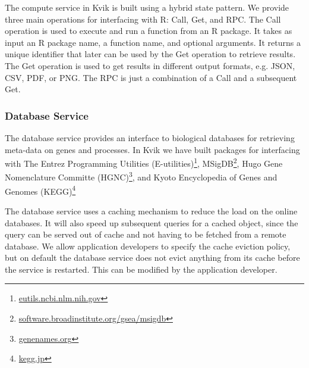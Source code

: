 The compute service in Kvik is built using a hybrid state
pattern\cite{opencpu}.
We provide three main operations for interfacing with R:
Call, Get, and RPC. The Call operation is used to execute and run a function
from an R package. It takes as input an R package name, a function name, and
optional arguments. It returns a unique identifier that later can be used by the
Get operation to retrieve results. The Get operation is used to get results in
different output formats, e.g. JSON, CSV, PDF, or PNG. The RPC is just a
combination of a Call and a subsequent Get. 




\subsubsection*{Database Service} 
The database service provides an interface to biological databases for
retrieving meta-data on genes and processes. In Kvik we have built packages for
interfacing with The Entrez Programming Utilities
(E-utilities)\footnote{\url{eutils.ncbi.nlm.nih.gov}},
MSigDB\footnote{\url{software.broadinstitute.org/gsea/msigdb}}, Hugo Gene
Nomenclature Committe (HGNC)\footnote{\url{genenames.org}}, and Kyoto Encyclopedia
of Genes and Genomes (KEGG)\footnote{\url{kegg.jp}}

The database service uses a caching mechanism to reduce the load on the online
databases. It will also speed up subsequent queries for a cached object, since
the query can be served out of cache and not having to be fetched from a remote
database. We allow application developers to specify the cache eviction policy,
but on default the database service does not evict anything from its cache
before the service is restarted. This can be modified by the application
developer. 




